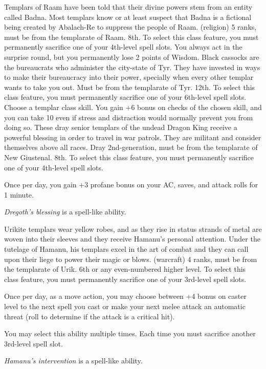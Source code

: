 {Templars of Raam have been told that their divine powers stem from an entity called Badna. Most templars know or at least suspect that Badna is a fictional being created by Abalach-Re to suppress the people of Raam.}
{ (religion) 5 ranks, must be from the templarate of Raam.}
{8th.}
{To select this class feature, you must permanently sacrifice one of your 4th-level spell slots.}
{
	You always act in the surprise round, but you permanently lose 2 points of Wisdom.
}
{Black cassocks are the bureaucrats who administer the city-state of Tyr. They have invested in ways to make their bureaucracy into their power, specially when every other templar wants to take you out.}
{Must be from the templarate of Tyr.}
{12th.}
{To select this class feature, you must permanently sacrifice one of your 6th-level spell slots.}
{
	Choose a templar class skill. You gain +6 bonus on checks of the chosen skill, and you can take 10 even if stress and distraction would normally prevent you from doing so.
}
{These dray senior templars of the undead Dragon King receive a powerful blessing in order to travel in war patrols. They are militant and consider themselves above all races.}
{Dray 2nd-generation, must be from the templarate of New Giustenal.}
{8th.}
{To select this class feature, you must permanently sacrifice one of your 4th-level spell slots.}
{
	Once per day, you gain +3 profane bonus on your AC, saves, and attack rolls for 1 minute.

	\emph{Dregoth's blessing} is a spell-like ability.
}
{Urikite templars wear yellow robes, and as they rise in status strands of metal are woven into their sleeves and they receive Hamanu's personal attention. Under the tutelage of Hamanu, his templars excel in the art of combat and they can call upon their liege to power their magic or blows.}
{ (warcraft) 4 ranks, must be from the templarate of Urik.}
{6th or any even-numbered higher level.}
{To select this class feature, you must permanently sacrifice one of your 3rd-level spell slots.}
{
	Once per day, as a move action, you may choose between +4 bonus on caster level to the next spell you cast or make your next melee attack an automatic threat (roll to determine if the attack is a critical hit).

	You may select this ability multiple times. Each time you must sacrifice another 3rd-level spell slot.

	\emph{Hamanu's intervention} is a spell-like ability.
}
